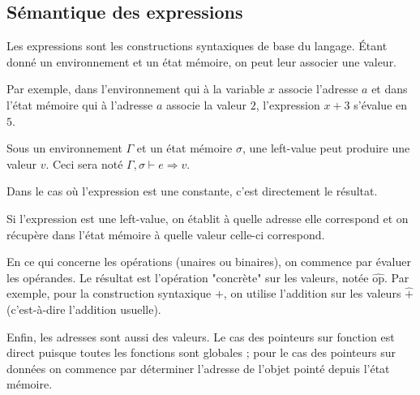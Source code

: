 \subsection{Sémantique des expressions}

Les expressions sont les constructions syntaxiques de base du langage. Étant
donné un environnement et un état mémoire, on peut leur associer une valeur.

Par exemple, dans l'environnement qui à la variable $x$ associe l'adresse $a$ et
dans l'état mémoire qui à l'adresse $a$ associe la valeur $2$, l'expression $x +
3$ s'évalue en $5$.

\begin{definition}
  Sous un environnement $Γ$ et un état mémoire $σ$, une left-value peut
  produire une valeur $v$. Ceci sera noté $Γ, σ ⊢ e ⇒ v$.
\end{definition}

Dans le cas où l'expression est une constante, c'est directement le résultat.

\begin{mathpar}
\end{mathpar}

Si l'expression est une left-value, on établit à quelle adresse elle correspond
et on récupère dans l'état mémoire à quelle valeur celle-ci correspond.

\begin{mathpar}
\end{mathpar}

En ce qui concerne les opérations (unaires ou binaires), on commence par évaluer
les opérandes. Le résultat est l'opération "concrète" sur les valeurs, notée
$\widehat{\textrm{op}}$. Par exemple, pour la construction syntaxique $+$, on
utilise l'addition sur les valeurs $\widehat{+}$ (c'est-à-dire l'addition
usuelle).


Enfin, les adresses sont aussi des valeurs. Le cas des pointeurs sur fonction
est direct puisque toutes les fonctions sont globales ; pour le cas des
pointeurs sur données on commence par déterminer l'adresse de l'objet pointé
depuis l'état mémoire.

